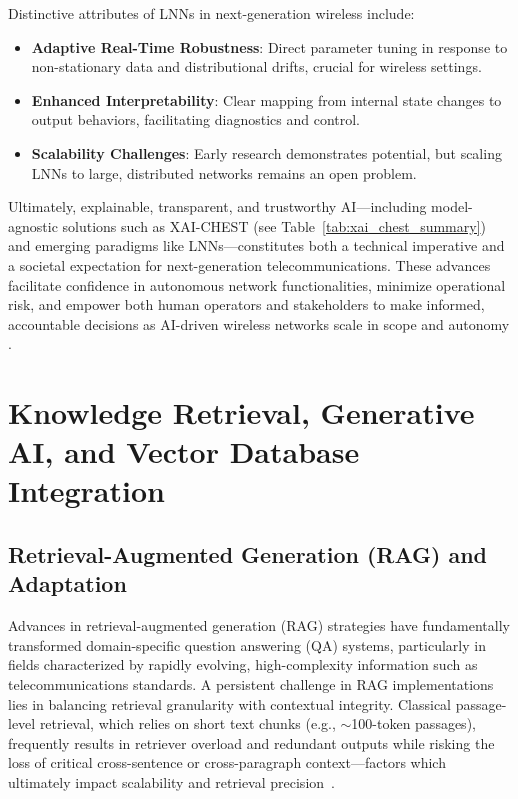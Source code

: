 \documentclass[11pt]{article}
\begin{document}
Distinctive attributes of LNNs in next-generation wireless include:

\begin{itemize}
    \item \textbf{Adaptive Real-Time Robustness}: Direct parameter tuning in response to non-stationary data and distributional drifts, crucial for wireless settings.
    \item \textbf{Enhanced Interpretability}: Clear mapping from internal state changes to output behaviors, facilitating diagnostics and control.
    \item \textbf{Scalability Challenges}: Early research demonstrates potential, but scaling LNNs to large, distributed networks remains an open problem.
\end{itemize}

Ultimately, explainable, transparent, and trustworthy AI—including model-agnostic solutions such as XAI-CHEST (see Table~\ref{tab:xai_chest_summary}) and emerging paradigms like LNNs—constitutes both a technical imperative and a societal expectation for next-generation telecommunications. These advances facilitate confidence in autonomous network functionalities, minimize operational risk, and empower both human operators and stakeholders to make informed, accountable decisions as AI-driven wireless networks scale in scope and autonomy \cite{ref41}.

\section{Knowledge Retrieval, Generative AI, and Vector Database Integration}
\label{sec:rag_vector_db}

\subsection{Retrieval-Augmented Generation (RAG) and Adaptation}

Advances in retrieval-augmented generation (RAG) strategies have fundamentally transformed domain-specific question answering (QA) systems, particularly in fields characterized by rapidly evolving, high-complexity information such as telecommunications standards. A persistent challenge in RAG implementations lies in balancing retrieval granularity with contextual integrity. Classical passage-level retrieval, which relies on short text chunks (e.g., \(\sim\)100-token passages), frequently results in retriever overload and redundant outputs while risking the loss of critical cross-sentence or cross-paragraph context---factors which ultimately impact scalability and retrieval precision~\cite{ref34}.
\end{document}
